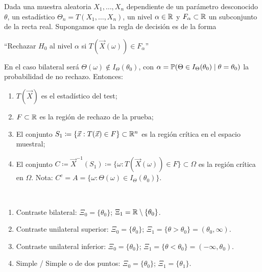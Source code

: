 \begin{definicion}[77]
Dada una muestra aleatoria $X_1, \dots, X_n$ dependiente de un parámetro desconocido $\theta$, un estadístico $\Theta_n = T(X_1, \dots, X_n)$, un nivel $\alpha \in \mathbb{R}$ y $F_\alpha \subset \mathbb{R}$ un subconjunto de la recta real. Supongamos que la regla de decisión es de la forma \begin{center}``Rechazar $H_0$ al nivel $\alpha$ si $T(\vec{X}(\omega)) \in F_\alpha$''\end{center} En el caso bilateral será $\Theta(\omega) \notin I_\Theta(\theta_0)$, con $\alpha = \mathbb{P}(\Theta \in I_\Theta(\theta_0) \mid \theta = \theta_0)$ la probabilidad de no rechazo. Entonces:
\begin{enumerate}
  \item $T(\vec{X})$ es el estadístico del test;
  \item $F \subset \mathbb{R}$ es la región de rechazo de la prueba;
  \item El conjunto $S_1 \coloneqq \{\vec{x} : T(\vec{x}) \in F\} \subset \mathbb{R}^n$ es la región crítica en el espacio muestral;
  \item El conjunto $C \coloneqq \vec{X}^{-1}(S_1) \coloneqq \{\omega : T(\vec{X}(\omega)) \in F\} \subset \Omega$ es la región crítica en $\Omega$. Nota: $C^c = A = \{\omega : \Theta(\omega) \in I_\Theta(\theta_0)\}$.
\end{enumerate}
\end{definicion}

\begin{definicion} \, 
\begin{enumerate}
  \item Contraste bilateral: $\Xi_0 = \{\theta_0\}$; $\Xi_1 = \mathbb{R} \setminus \{\theta_0\}$.
  \item Contraste unilateral superior: $\Xi_0 = \{\theta_0\}$; $\Xi_1 = \{\theta > \theta_0\} = (\theta_0, \infty)$.
  \item Contraste unilateral inferior: $\Xi_0 = \{\theta_0\}$; $\Xi_1 = \{\theta < \theta_0\} = (-\infty, \theta_0)$.
  \item Simple / Simple o de dos puntos: $\Xi_0 = \{\theta_0\}$; $\Xi_1 = \{\theta_1\}$.
\end{enumerate}
\end{definicion}

